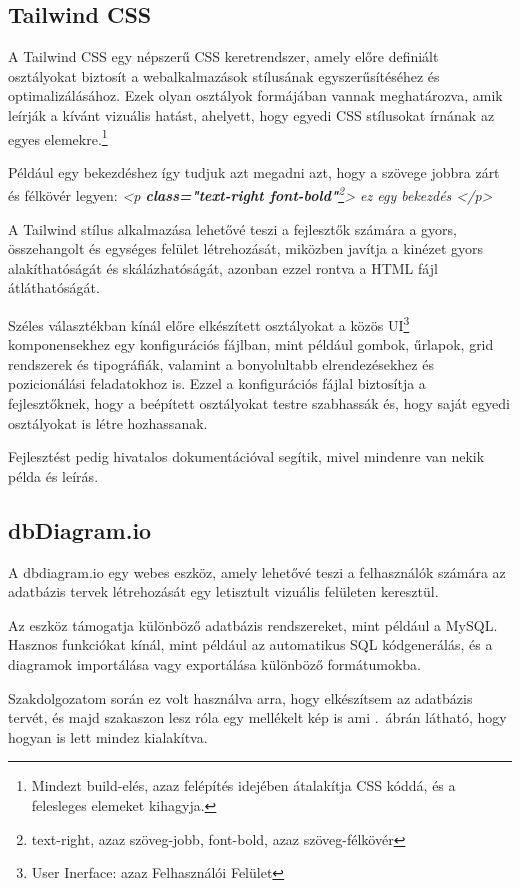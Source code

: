 \documentclass[
]{thesis-ekf}
\theoremstyle{definition}
\theoremstyle{remark}
\begin{document}
	\subsection{Tailwind CSS}\label{tailwind}
	A Tailwind CSS egy népszerű CSS keretrendszer, amely előre definiált osztályokat biztosít a webalkalmazások stílusának egyszerűsítéséhez és optimalizálásához. Ezek olyan osztályok formájában vannak meghatározva, amik leírják a kívánt vizuális hatást, ahelyett, hogy egyedi CSS stílusokat írnának az egyes elemekre.\footnote{Mindezt build-elés, azaz felépítés idejében átalakítja CSS kóddá, és a felesleges elemeket kihagyja.}
	
	Például egy bekezdéshez így tudjuk azt megadni azt, hogy a szövege jobbra zárt és félkövér legyen: \emph{<p \textbf{class="text-right font-bold"}\footnote{text-right, azaz szöveg-jobb, font-bold, azaz szöveg-félkövér}> ez egy bekezdés </p>}
	
	A Tailwind stílus alkalmazása lehetővé teszi a fejlesztők számára a gyors, összehangolt és egységes felület létrehozását, miközben javítja a kinézet gyors alakíthatóságát és skálázhatóságát, azonban ezzel rontva a HTML fájl átláthatóságát.
	
	Széles választékban kínál előre elkészített osztályokat a közös UI\footnote{User Inerface: azaz Felhasználói Felület} komponensekhez egy konfigurációs fájlban, mint például gombok, űrlapok, grid rendszerek és tipográfiák, valamint a bonyolultabb elrendezésekhez és pozicionálási feladatokhoz is. Ezzel a konfigurációs fájlal biztosítja a fejlesztőknek, hogy a beépített osztályokat testre szabhassák és, hogy saját egyedi osztályokat is létre hozhassanak. 
	
	Fejlesztést pedig hivatalos dokumentációval segítik, mivel mindenre van nekik példa és leírás.\cite{tailwind-docs}
	
	
	\subsection{dbDiagram.io}
	A dbdiagram.io egy webes eszköz, amely lehetővé teszi a felhasználók számára az adatbázis tervek létrehozását egy letisztult vizuális felületen keresztül. 
	
	Az eszköz támogatja különböző adatbázis rendszereket, mint például a MySQL. Hasznos funkciókat kínál, mint például az automatikus SQL kódgenerálás, és a diagramok importálása vagy exportálása különböző formátumokba.\cite{dbdiagram-io}
	
	Szakdolgozatom során ez volt használva arra, hogy elkészítsem az adatbázis tervét, és majd  szakaszon lesz róla egy mellékelt kép is ami .~ábrán látható, hogy hogyan is lett mindez kialakítva.
	
\end{document}
